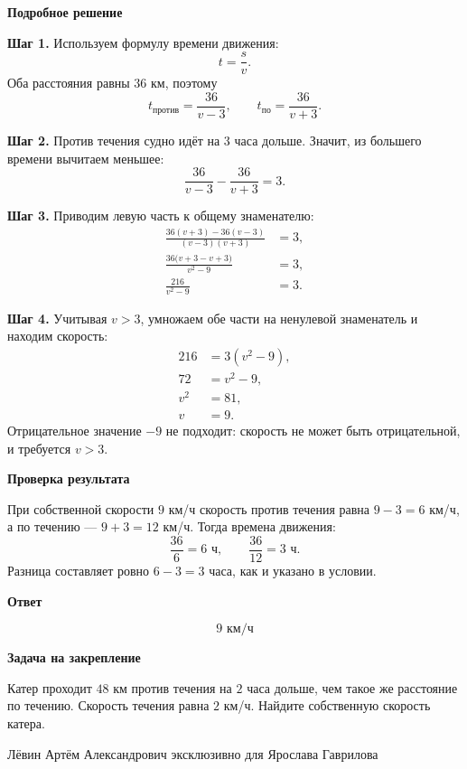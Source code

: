 \documentclass[a4paper,11pt]{article}
\newcommand{\sectlabel}[1]{\par\medskip\textbf{\color{darkaccent}#1}\par\vspace{-2pt}}
\begin{document}
\sectlabel{Подробное решение}
\textbf{Шаг 1.} Используем формулу времени движения:
\[
 t=\frac{s}{v}.
\]
Оба расстояния равны $36$ км, поэтому
\[
 t_{\text{против}}=\frac{36}{v-3},\qquad
 t_{\text{по}}=\frac{36}{v+3}.
\]

\textbf{Шаг 2.} Против течения судно идёт на $3$ часа дольше. Значит, из большего времени вычитаем меньшее:
\[
\frac{36}{v-3}-\frac{36}{v+3}=3.
\]

\textbf{Шаг 3.} Приводим левую часть к общему знаменателю:
\[
\begin{aligned}
\frac{36(v+3)-36(v-3)}{(v-3)(v+3)}&=3,\\[2pt]
\frac{36\bigl(v+3-v+3\bigr)}{v^2-9}&=3,\\[2pt]
\frac{216}{v^2-9}&=3.
\end{aligned}
\]

\textbf{Шаг 4.} Учитывая $v>3$, умножаем обе части на ненулевой знаменатель и находим скорость:
\[
\begin{aligned}
216&=3(v^2-9),\\
72&=v^2-9,\\
v^2&=81,\\
v&=9.
\end{aligned}
\]
Отрицательное значение $-9$ не подходит: скорость не может быть отрицательной, и требуется $v>3$.

\sectlabel{Проверка результата}
При собственной скорости $9$ км/ч скорость против течения равна $9-3=6$ км/ч, а по течению --- $9+3=12$ км/ч. Тогда времена движения:
\[
\frac{36}{6}=6\text{ ч},\qquad \frac{36}{12}=3\text{ ч}.
\]
Разница составляет ровно $6-3=3$ часа, как и указано в условии.

\sectlabel{Ответ}
\[\boxed{9\text{ км/ч}}\]

\sectlabel{Задача на закрепление}
Катер проходит $48$ км против течения на $2$ часа дольше, чем такое же расстояние по течению. Скорость течения равна $2$ км/ч. Найдите собственную скорость катера.

\vfill
{\footnotesize\color{muted}Лёвин Артём Александрович эксклюзивно для Ярослава Гаврилова}
\end{document}
